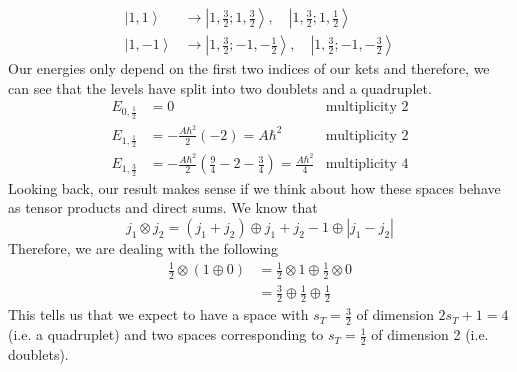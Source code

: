 \documentclass[a4paper, 11pt]{article}
\newcommand{\ket}[1]{\ensuremath{\left|#1\right\rangle}}
\newenvironment{solution}{%
	\begin{list}{}{%
			\setlength{\topsep}{0pt}%
			\setlength{\leftmargin}{0.5cm}%
			\setlength{\rightmargin}{0.5cm}%
			\setlength{\listparindent}{\parindent}%
			\setlength{\itemindent}{\parindent}%
			\setlength{\parsep}{\parskip}%
		}%
		\item[]}{\end{list}}
\begin{document}
\begin{enumerate}[leftmargin=0em]
\begin{solution}
\begin{align}
         \ket{1,1}&\longrightarrow \ket{1,\frac{3}{2}; 1,\frac{3}{2}},\quad \ket{1,\frac{3}{2};1,\frac{1}{2}}\\
         \ket{1,-1}&\longrightarrow \ket{1,\frac{3}{2};-1,-\frac{1}{2}},\quad\ket{1,\frac{3}{2};-1,-\frac{3}{2}}
       \end{align}
       Our energies only depend on the first two indices of our kets and
       therefore, we can see that the levels have split into two doublets and a
       quadruplet.
       \begin{align}
         E_{0,\frac{1}{2}} &= 0 &\text{multiplicity }2\\
         E_{1,\frac{1}{2}} &= -\frac{A\hbar^2}{2}\left(-2 \right) = A\hbar^2 &\text{multiplicity }2\\
         E_{1,\frac{3}{2}} &= -\frac{A\hbar^2}{2}\left( \frac{9}{4}-2-\frac{3}{4} \right)= \frac{A\hbar^2}{4} &\text{multiplicity }4
       \end{align}
       Looking back, our result makes sense if we think about how these spaces
       behave as tensor products and direct sums. We know that
       \begin{equation}
         j_1\otimes j_2 = (j_1+j_2)\oplus j_1+j_2-1\oplus |j_1-j_2|
       \end{equation}
       Therefore, we are dealing with the following
       \begin{align}
         \frac{1}{2}\otimes(1\oplus 0) &= \frac{1}{2}\otimes 1\oplus \frac{1}{2}\otimes 0 \\
         &= \frac{3}{2}\oplus \frac{1}{2}\oplus\frac{1}{2}
       \end{align}
       This tells us that we expect to have a space with $s_T=\frac{3}{2}$ of
       dimension $2s_T+1=4$ (i.e. a quadruplet) and two spaces corresponding to
       $s_T=\frac{1}{2}$ of dimension 2 (i.e. doublets). 
         
       
    \end{solution}
    

\end{enumerate}
\end{document}
